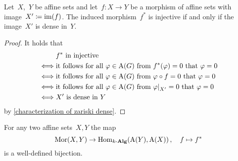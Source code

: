 \begin{lemma}
  Let~$X$,~$Y$ be affine sets and let~$f \colon X \to Y$ be a morphism of affine sets with image~$X' \coloneqq \operatorname{im}(f)$.
  The induced morphism~$f^*$ is injective if and only if the image~$X'$ is dense in~$Y$.
\end{lemma}


\begin{proof}
  \leavevmode
  It holds that
  \begin{align*}
        &{} \text{$f^*$ in injective} \\
    \iff&{} \text{it follows for all~$\varphi \in \coord(G)$ from~$f^*(\varphi) = 0$ that~$\varphi = 0$} \\
    \iff&{} \text{it follows for all~$\varphi \in \coord(G)$ from~$\varphi \circ f = 0$ that~$\varphi = 0$} \\
    \iff&{} \text{it follows for all~$\varphi \in \coord(G)$ from~$\restrict{\varphi}{X'} = 0$ that~$\varphi = 0$} \\
    \iff&{} \text{$X'$ is dense in~$Y$}
  \end{align*}
  by \cref{characterization of zariski dense}.
\end{proof}



\begin{proposition}
  \label{coordinate ring is fully faithful}
  For any two affine sets~$X,Y$ the map
  \[
            \operatorname{Mor}(X, Y)
    \to     \operatorname{Hom}_{k\text{-}\mathbf{Alg}}( \operatorname{A}(Y), \operatorname{A}(X) ) \,,
    \quad   f
    \mapsto f^*
  \]
  is a well-defined bijection.
\end{proposition}


